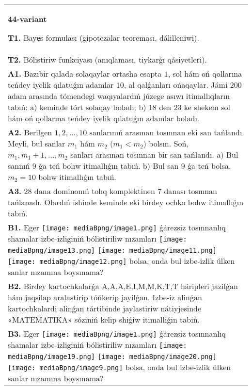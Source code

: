 \documentclass{article}
\begin{document}
\begin{tabular}{m{17cm}}
\textbf{44-variant}
\newline

\textbf{T1.} Bayеs formulası (gipotezalar teoreması, dálilleniwi).
 \\
\textbf{T2.} Bólistiriw funkciyası (anıqlaması, tiykarǵı qásiyetleri).
 \\
\textbf{A1.} Bazıbir qalada solaqaylar ortasha esapta $1$, sol hám oń qollarına teńdey iyelik qılatuǵın adamlar $10$, al qalǵanları ońaqaylar. Jámi 200 adam arasında tómendegi waqıyalardıń júzege asıwı itimallıqların tabıń: a) keminde tórt solaqay boladı; b) 18 den 23 ke shekem sol hám oń qollarına teńdey iyelik qılatuǵın adamlar boladı.
 \\
\textbf{A2.} Berilgen $1,2,\ldots ,10$ sanlarınıń arasınan tosınnan eki san tańlandı. Meyli, bul sanlar ${{m}_{1}}$ hám ${{m}_{2}}$ (${{m}_{1}}<{{m}_{2}}$) bolsın. Soń, ${{m}_{1}},{{m}_{1}}+1,\ldots ,{{m}_{2}}$ sanları arasınan tosınnan bir san tańlandı. a) Bul sannıń 9 ǵa teń bolıw itimallıǵın tabıń. b) Bul san 9 ǵa teń bolsa, ${{m}_{2}}=10$ bolıw itimallıǵın tabıń.
 \\
\textbf{A3.} 28 dana dominonıń tolıq komplektinen 7 danası tosınnan tańlanadı. Olardıń ishinde keminde eki birdey ochko bolıw itimallıǵın tabıń.
 \\
\textbf{B1.} Eger \texttt{[image: mediaBpng/image1.png]} ǵárezsiz tosınnanlıq shamalar izbe-izliginiń bólistiriliw nızamları
\texttt{[image: mediaBpng/image13.png]} \texttt{[image: mediaBpng/image11.png]} \texttt{[image: mediaBpng/image12.png]}
bolsa, onda bul izbe-izlik úlken sanlar nızamına boysınama?
 \\
\textbf{B2.} Birdey kartochkalarǵa A,A,A,E,I,M,M,K,T,T háripleri jazilǵan hám jaqsilap aralastirip tóńkerip jayilǵan. Izbe-iz alinǵan kartochkalardi alinǵan tártibinde jaylastiriw nátiyjesinde «MATEMATIKA» sóziniń kelip shiǵiw itimalliǵin tabiń.
 \\
\textbf{B3.} Eger \texttt{[image: mediaBpng/image1.png]} ǵárezsiz tosınnanlıq shamalar izbe-izliginiń bólistiriliw nızamları
\texttt{[image: mediaBpng/image19.png]} \texttt{[image: mediaBpng/image20.png]} \texttt{[image: mediaBpng/image9.png]}
bolsa, onda bul izbe-izlik úlken sanlar nızamına boysınama?

\end{tabular}
\end{document}

